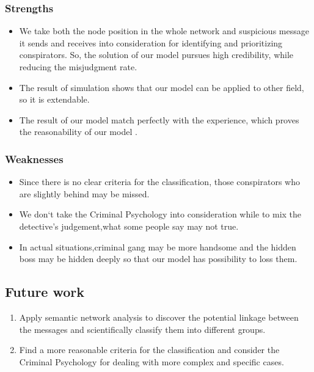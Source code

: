 \documentclass[12pt]{article}
\begin{document}
\subsubsection{Strengths} 
\begin{itemize}
\item We take both the node position in the whole network and suspicious message it sends and receives into consideration for identifying and prioritizing conspirators. So, the solution of our model pursues high credibility, while reducing the misjudgment rate. 
\item The result of simulation shows that our model can be applied to other field, so it is extendable.
\item The result of our model match perfectly with the experience, which proves the reasonability of our model .
\end{itemize}

\subsubsection{Weaknesses}  
\begin{itemize}
\item Since there is no clear criteria for the classification, those conspirators who are slightly behind may be missed. 
\item We don‘t take the Criminal Psychology into consideration while to mix the detective’s judgement,what some people say may not true.
\item In actual situations,criminal gang may be more handsome and the hidden boss may be hidden deeply so that our model has possibility to loss them.
\end{itemize}

\subsection{Future work} 
\begin{enumerate}
\item Apply semantic network analysis to discover the potential linkage between the messages and scientifically classify them into different groups. 
\item Find a more reasonable criteria for the classification and consider the Criminal Psychology for dealing with more complex and specific cases.
\end{enumerate}
\end{document}
